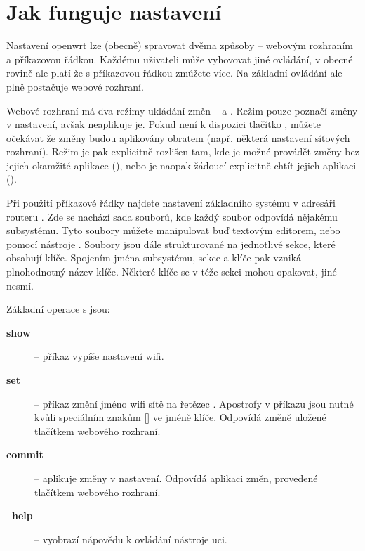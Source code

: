 \section{Jak funguje nastavení}
Nastavení \gls{openwrt} lze (obecně) spravovat dvěma způsoby -- webovým
rozhraním a příkazovou řádkou. Každému uživateli může vyhovovat jiné ovládání,
v obecné rovině ale platí že s příkazovou řádkou zmůžete více. Na základní
ovládání ale plně postačuje webové rozhraní.

Webové rozhraní má dva režimy ukládání změn --  a .
Režim  pouze poznačí změny v nastavení, avšak neaplikuje je. Pokud
není k dispozici tlačítko , můžete očekávat že změny budou
aplikovány obratem (např. některá nastavení síťových rozhraní). Režim
 je pak explicitně rozlišen tam, kde je možné provádět změny
bez jejich okamžité aplikace (), nebo je naopak žádoucí explicitně
chtít jejich aplikaci ().

Při použití příkazové řádky najdete nastavení základního systému v adresáři
routeru .
Zde se nachází sada souborů, kde každý soubor odpovídá nějakému subsystému.
Tyto soubory můžete manipulovat buď textovým editorem, nebo pomocí nástroje
. Soubory jsou dále strukturované na jednotlivé sekce, které obsahují
klíče. Spojením jména subsystému, sekce a klíče pak vzniká plnohodnotný
název klíče. Některé klíče se v téže sekci mohou opakovat, jiné nesmí.

Základní operace s  jsou:
\begin{description}
\item[\textbf{show}] -- příkaz  vypíše nastavení wifi.
\item[\textbf{set}] -- příkaz 
změní jméno wifi sítě na řetězec . Apostrofy v příkazu jsou nutné
kvůli speciálním znakům [] ve jméně klíče. Odpovídá změně uložené tlačítkem
 webového rozhraní.
\item[\textbf{commit}] -- aplikuje změny v nastavení. Odpovídá aplikaci změn,
provedené tlačítkem  webového rozhraní.
\item[\textbf{--help}] -- vyobrazí nápovědu k ovládání nástroje uci.
\end{description}
